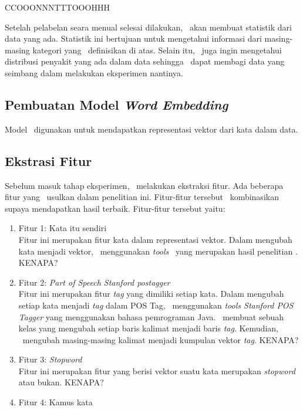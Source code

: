 	CCOOONNNTTTOOOHHH
	
	Setelah pelabelan seara menual selesai dilakukan, \saya~akan membuat statistik dari data yang ada. Statistik ini bertujuan untuk mengetahui informasi dari masing-masing kategori yang \saya~definisikan di atas. Selain itu, \saya~juga ingin mengetahui distribusi penyakit yang ada dalam data sehingga \saya~dapat membagi data yang seimbang dalam melakukan eksperimen nantinya.
	
	\subsection{Pembuatan Model \textit{Word Embedding}}
	Model \we~digunakan untuk mendapatkan representasi vektor dari kata dalam data.
	
	\subsection{Ekstrasi Fitur}
	Sebelum masuk tahap eksperimen, \saya~melakukan ekstraksi fitur. Ada beberapa fitur yang \saya~usulkan dalam penelitian ini. Fitur-fitur tersebut \saya~kombinasikan supaya mendapatkan hasil terbaik. Fitur-fitur tersebut yaitu:
	\begin{enumerate}
		\item Fitur 1: Kata itu sendiri\\
		Fitur ini merupakan fitur kata dalam representasi vektor. Dalam mengubah kata menjadi vektor, \saya~menggunakan \textit{tools} \we~yang merupakan hasil penelitian \cite{rehurek_lrec}. KENAPA?
		
		\item Fitur 2: \textit{Part of Speech Stanford postagger}\\
		Fitur ini merupakan fitur \textit{tag} yang dimiliki setiap kata. Dalam mengubah setiap kata menjadi \textit{tag} dalam POS Tag, \saya~menggunakan \textit{tools Stanford POS Tagger} yang menggunakan bahasa pemrograman Java. \Saya~membuat sebuah kelas yang mengubah setiap baris kalimat menjadi baris \textit{tag}. Kemudian, \saya~mengubah masing-masing kalimat menjadi kumpulan vektor \textit{tag}. KENAPA?
		
		\item Fitur 3: \textit{Stopword}\\
		Fitur ini merupakan fitur yang berisi vektor suatu kata merupakan \textit{stopword} atau bukan. KENAPA?
		
		\item Fitur 4: Kamus kata\\
	\end{enumerate}
	
